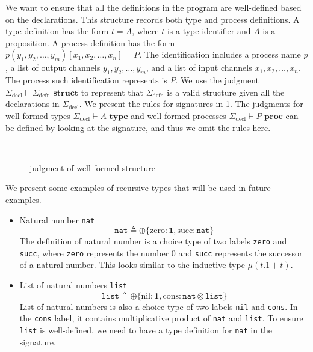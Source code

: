 \documentclass[12pt, openany]{memoir}
\begin{document}
We want to ensure that all the definitions in the program are well-defined based on the declarations. 
This structure records both type and process definitions. A type definition has the form $t = A$, 
where $t$ is a type identifier and $A$ is a proposition. A process definition has the form $p (y_1, y_2, \ldots, y_m) [x_1, x_2, \ldots, x_n] = P$. 
The identification includes a process name $p$, a list of output channels $y_1, y_2, \ldots, y_m$, 
and a list of input channels $x_1, x_2, \ldots, x_n$. The process such identification represents is $P$. 
We use the judgment $\Sigma_{\text{decl}} \vdash \Sigma_{\text{defn}} \textbf{ struct}$ to represent that $\Sigma_{\text{defn}}$ 
is a valid structure given all the declarations in $\Sigma_{\text{decl}}$. We present the rules for signatures in \cref{fig:sig}. 
The judgments for well-formed types $\Sigma_{\text{decl}} \vdash A \textbf{ type}$ 
and well-formed processes $\Sigma_{\text{decl}} \vdash P \textbf{ proc}$ can be defined by looking at the signature, 
and thus we omit the rules here.
\begin{figure}[H]
  \centering
  \begin{rules}
    \qquad
    \\
  \end{rules}
  \caption{judgment of well-formed structure}
  \label{fig:sig}
\end{figure}
We present some examples of recursive types that will be used in future examples.
\begin{itemize}
  \item Natural number \texttt{nat}
  \[
    \texttt{nat} \triangleq \oplus\{\text{zero} : \textbf{1}, \text{succ} : \texttt{nat}\}
  \]
  The definition of natural number is a choice type of two labels \texttt{zero} and \texttt{succ},
  where \texttt{zero} represents the number $0$ and \texttt{succ} represents the successor of a natural number.
  This looks similar to the inductive type $\mu(t.1 + t)$.
  \item List of natural numbers \texttt{list}
  \[
    \texttt{list} \triangleq \oplus\{\text{nil} : \textbf{1}, \text{cons} : \texttt{nat} \otimes \texttt{list}\}
  \]
  List of natural numbers is also a choice type of two labels \texttt{nil} and \texttt{cons}.
  In the \texttt{cons} label, it contains multiplicative product of \texttt{nat} and \texttt{list}.
  To ensure \texttt{list} is well-defined, we need to have a type definition for \texttt{nat} in the signature. 
\end{itemize}
\end{document}
